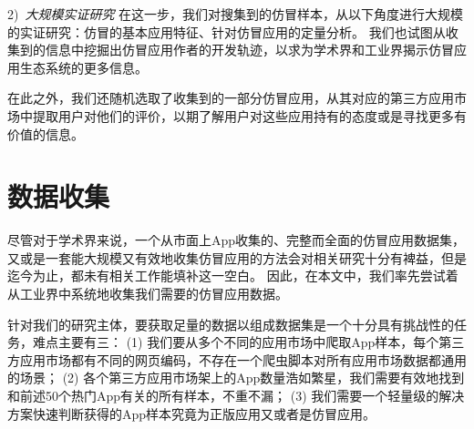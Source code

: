 2)\ \emph{大规模实证研究} \quad
在这一步，我们对搜集到的仿冒样本，从以下角度进行大规模的实证研究：仿冒的基本应用特征、针对仿冒应用的定量分析。
我们也试图从收集到的信息中挖掘出仿冒应用作者的开发轨迹，以求为学术界和工业界揭示仿冒应用生态系统的更多信息。

在此之外，我们还随机选取了收集到的一部分仿冒应用，从其对应的第三方应用市场中提取用户对他们的评价，以期了解用户对这些应用持有的态度或是寻找更多有价值的信息。

\section{数据收集}
尽管对于学术界来说，一个从市面上App收集的、完整而全面的仿冒应用数据集，又或是一套能大规模又有效地收集仿冒应用的方法会对相关研究十分有裨益，但是迄今为止，都未有相关工作能填补这一空白。
因此，在本文中，我们率先尝试着从工业界中系统地收集我们需要的仿冒应用数据。

针对我们的研究主体，要获取足量的数据以组成数据集是一个十分具有挑战性的任务，难点主要有三：
(1) 我们要从多个不同的应用市场中爬取App样本，每个第三方应用市场都有不同的网页编码，不存在一个爬虫脚本对所有应用市场数据都通用的场景；
(2) 各个第三方应用市场架上的App数量浩如繁星，我们需要有效地找到和前述50个热门App有关的所有样本，不重不漏；
(3) 我们需要一个轻量级的解决方案快速判断获得的App样本究竟为正版应用又或者是仿冒应用。

